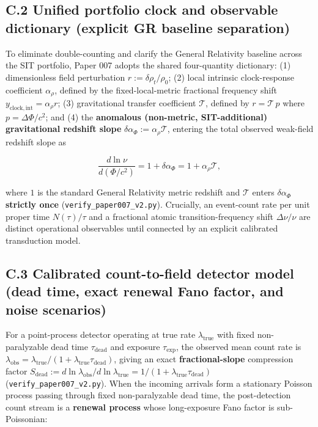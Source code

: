\documentclass[
  american,
  11pt,
  letterpaper,
]{article}
\begin{document}
\subsection{C.2 Unified portfolio clock and observable dictionary (explicit GR baseline separation)}\label{c.2-unified-portfolio-clock-and-observable-dictionary-explicit-gr-baseline-separation}

To eliminate double-counting and clarify the General Relativity baseline across the SIT portfolio, Paper 007 adopts the shared four-quantity dictionary: (1) dimensionless field perturbation \(r := \delta\rho_t / \rho_0\); (2) local intrinsic clock-response coefficient \(\alpha_\rho\), defined by the fixed-local-metric fractional frequency shift \(y_{\mathrm{clock,int}} = \alpha_\rho r\); (3) gravitational transfer coefficient \(\mathcal{T}\), defined by \(r = \mathcal{T}\,p\) where \(p = \Delta\Phi/c^2\); and (4) the \textbf{anomalous (non-metric, SIT-additional) gravitational redshift slope} \(\delta\alpha_\Phi := \alpha_\rho \mathcal{T}\), entering the total observed weak-field redshift slope as

\begin{equation}
\frac{d\ln\nu}{d(\Phi/c^2)} = 1 + \delta\alpha_\Phi = 1 + \alpha_\rho \mathcal{T},
\end{equation}

where \(1\) is the standard General Relativity metric redshift and \(\mathcal{T}\) enters \(\delta\alpha_\Phi\) \textbf{strictly once} (\nolinkurl{verify_paper007_v2.py}). Crucially, an event-count rate per unit proper time \(N(\tau)/\tau\) and a fractional atomic transition-frequency shift \(\Delta\nu/\nu\) are distinct operational observables until connected by an explicit calibrated transduction model.

\subsection{C.3 Calibrated count-to-field detector model (dead time, exact renewal Fano factor, and noise scenarios)}\label{c.3-calibrated-count-to-field-detector-model-dead-time-exact-renewal-fano-factor-and-noise-scenarios}

For a point-process detector operating at true rate \(\lambda_{\mathrm{true}}\) with fixed non-paralyzable dead time \(\tau_{\mathrm{dead}}\) and exposure \(\tau_{\mathrm{exp}}\), the observed mean count rate is \(\lambda_{\mathrm{obs}} = \lambda_{\mathrm{true}}/(1 + \lambda_{\mathrm{true}}\tau_{\mathrm{dead}})\), giving an exact \textbf{fractional-slope} compression factor \(S_{\mathrm{dead}} := d\ln\lambda_{\mathrm{obs}} / d\ln\lambda_{\mathrm{true}} = 1/(1 + \lambda_{\mathrm{true}}\tau_{\mathrm{dead}})\) (\nolinkurl{verify_paper007_v2.py}). When the incoming arrivals form a stationary Poisson process passing through fixed non-paralyzable dead time, the post-detection count stream is a \textbf{renewal process} whose long-exposure Fano factor is sub-Poissonian:
\end{document}
